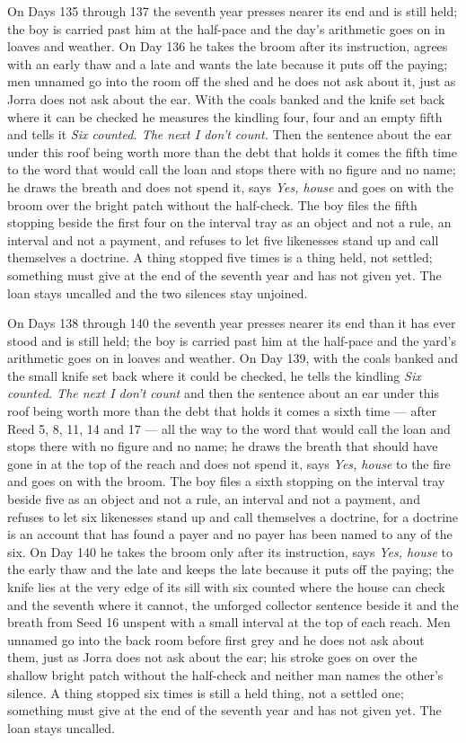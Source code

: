 \documentclass{design/chronicle}
\begin{document}
{On Days 135 through 137 the seventh year presses nearer its end and is still held; the boy is carried past him at the half-pace and the day’s arithmetic goes on in loaves and weather. On Day 136 he takes the broom after its instruction, agrees with an early thaw and a late and wants the late because it puts off the paying; men unnamed go into the room off the shed and he does not ask about it, just as Jorra does not ask about the ear. With the coals banked and the knife set back where it can be checked he measures the kindling four, four and an empty fifth and tells it \emph{Six counted. The next I don’t count.} Then the sentence about the ear under this roof being worth more than the debt that holds it comes the fifth time to the word that would call the loan and stops there with no figure and no name; he draws the breath and does not spend it, says \emph{Yes, house} and goes on with the broom over the bright patch without the half-check. The boy files the fifth stopping beside the first four on the interval tray as an object and not a rule, an interval and not a payment, and refuses to let five likenesses stand up and call themselves a doctrine. A thing stopped five times is a thing held, not settled; something must give at the end of the seventh year and has not given yet. The loan stays uncalled and the two silences stay unjoined.

On Days 138 through 140 the seventh year presses nearer its end than it has ever stood and is still held; the boy is carried past him at the half-pace and the yard’s arithmetic goes on in loaves and weather. On Day 139, with the coals banked and the small knife set back where it could be checked, he tells the kindling \emph{Six counted. The next I don’t count} and then the sentence about an ear under this roof being worth more than the debt that holds it comes a sixth time --- after Reed 5, 8, 11, 14 and 17 --- all the way to the word that would call the loan and stops there with no figure and no name; he draws the breath that should have gone in at the top of the reach and does not spend it, says \emph{Yes, house} to the fire and goes on with the broom. The boy files a sixth stopping on the interval tray beside five as an object and not a rule, an interval and not a payment, and refuses to let six likenesses stand up and call themselves a doctrine, for a doctrine is an account that has found a payer and no payer has been named to any of the six. On Day 140 he takes the broom only after its instruction, says \emph{Yes, house} to the early thaw and the late and keeps the late because it puts off the paying; the knife lies at the very edge of its sill with six counted where the house can check and the seventh where it cannot, the unforged collector sentence beside it and the breath from Seed 16 unspent with a small interval at the top of each reach. Men unnamed go into the back room before first grey and he does not ask about them, just as Jorra does not ask about the ear; his stroke goes on over the shallow bright patch without the half-check and neither man names the other’s silence. A thing stopped six times is still a held thing, not a settled one; something must give at the end of the seventh year and has not given yet. The loan stays uncalled.

}
\end{document}
